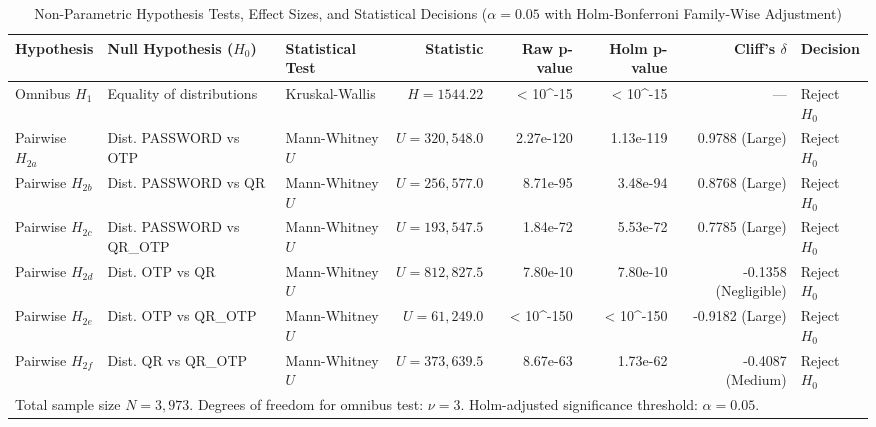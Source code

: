 \begin{table}[t]
\centering
\small
\caption{Non-Parametric Hypothesis Tests, Effect Sizes, and Statistical Decisions ($\alpha = 0.05$ with Holm-Bonferroni Family-Wise Adjustment)}
\label{tab:hypothesis_testing}
\begin{tabular}{lp{4.0cm}lrrrrl}
\hline
\textbf{Hypothesis} & \textbf{Null Hypothesis ($H_0$)} & \textbf{Statistical Test} & \textbf{Statistic} & \textbf{Raw p-value} & \textbf{Holm p-value} & \textbf{Cliff's $\delta$} & \textbf{Decision} \\
\hline
Omnibus $H_1$ & Equality of distributions & Kruskal-Wallis & $H = 1544.22$ & < 10^{-15} & < 10^{-15} & --- & Reject $H_0$ \\
\hline
Pairwise $H_{2a}$ & Dist. PASSWORD vs OTP & Mann-Whitney $U$ & $U = 320,548.0$ & 2.27e-120 & 1.13e-119 & 0.9788 (Large) & Reject $H_0$ \\
Pairwise $H_{2b}$ & Dist. PASSWORD vs QR & Mann-Whitney $U$ & $U = 256,577.0$ & 8.71e-95 & 3.48e-94 & 0.8768 (Large) & Reject $H_0$ \\
Pairwise $H_{2c}$ & Dist. PASSWORD vs QR_OTP & Mann-Whitney $U$ & $U = 193,547.5$ & 1.84e-72 & 5.53e-72 & 0.7785 (Large) & Reject $H_0$ \\
Pairwise $H_{2d}$ & Dist. OTP vs QR & Mann-Whitney $U$ & $U = 812,827.5$ & 7.80e-10 & 7.80e-10 & -0.1358 (Negligible) & Reject $H_0$ \\
Pairwise $H_{2e}$ & Dist. OTP vs QR_OTP & Mann-Whitney $U$ & $U = 61,249.0$ & < 10^{-150} & < 10^{-150} & -0.9182 (Large) & Reject $H_0$ \\
Pairwise $H_{2f}$ & Dist. QR vs QR_OTP & Mann-Whitney $U$ & $U = 373,639.5$ & 8.67e-63 & 1.73e-62 & -0.4087 (Medium) & Reject $H_0$ \\
\hline
\multicolumn{8}{l}{\footnotesize Total sample size $N = 3,973$. Degrees of freedom for omnibus test: $\nu = 3$. Holm-adjusted significance threshold: $\alpha = 0.05$.} \\
\end{tabular}
\end{table}
